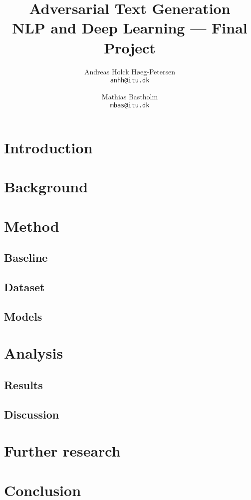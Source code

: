 \documentclass{article}
\title{%
    Adversarial Text Generation\\
    \large NLP and Deep Learning --- Final Project
}
\author{%
    Andreas Holck Høeg-Petersen\\
    \texttt{anhh@itu.dk}
    \and
    Mathias Bastholm\\
    \texttt{mbas@itu.dk}
}
\begin{document}
\maketitle

\section{Introduction}


\section{Background}


\section{Method}


\subsection{Baseline}


\subsection{Dataset}


\subsection{Models}


\section*{Analysis}


\subsection{Results}


\subsection{Discussion}


\section{Further research}


\section{Conclusion}
\end{document}
